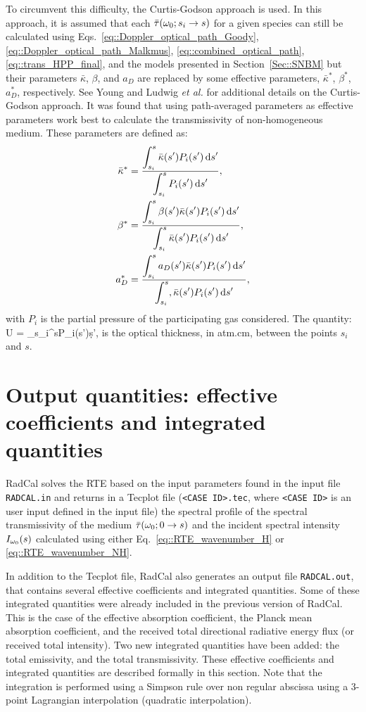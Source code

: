 To circumvent this difficulty, the Curtis-Godson approach is used. In this approach, it is assumed that
each $\bar{\tau}(\omega_0; s_i \rightarrow s)$ for a given species can still be calculated using Eqs.~\ref{eq::Doppler_optical_path_Goody}, \ref{eq::Doppler_optical_path_Malkmus}, \ref{eq::combined_optical_path}, \ref{eq::trans_HPP_final}, and the models presented in Section~\ref{Sec::SNBM} but their parameters $\bar{\kappa}$, $\beta$, and $a_D$ are replaced by some effective parameters, $\bar{\kappa}^*$, $\beta^*$, $a_{D}^*$, respectively. See Young \cite{Young1977d} and Ludwig \textit{et al.} \cite{Ludwig1973} for additional details on the Curtis-Godson approach. It was found that using path-averaged parameters as effective parameters work best \cite{Young1977d} to calculate the transmissivity of non-homogeneous medium. These parameters are defined as:
\begin{align}
\bar{\kappa}^* &= \dfrac{\displaystyle\int_{s_i}^{s} \bar{\kappa}(s')P_i(s')\,\mathrm{d} s'}{\displaystyle\int_{s_i}^{s} P_i(s')\,\mathrm{d} s'}, \label{eq::effective_kappa} \\
\beta^* &= \dfrac{\displaystyle\int_{s_i}^{s} \beta(s')\bar{\kappa}(s')P_i(s')\,\mathrm{d} s'}{\displaystyle\int_{s_i}^{s} \bar{\kappa}(s')P_i(s')\,\mathrm{d} s'}, \label{eq::effective_beta}\\
a_D^* &= \dfrac{\displaystyle\int_{s_i}^{s} a_D(s')\bar{\kappa}(s')P_i(s')\,\mathrm{d} s'}{\displaystyle\int_{s_i}^{s}, \bar{\kappa}(s')P_i(s')\,\mathrm{d} s'},\label{eq::effective_ad}
\end{align}
with $P_i$ is the partial pressure of the participating gas considered. The quantity:
\be
U = \displaystyle\int_{s_i}^{s}{P_i(s')\d s'},
\ee
is the optical thickness, in {\rm atm.cm}, between the points $s_i$ and $s$.

\section{Output quantities: effective coefficients and integrated quantities}\label{sec::Output}
RadCal solves the RTE based on the input parameters found in the input file \verb=RADCAL.in= and returns in a Tecplot file (\verb=<CASE ID>.tec=, where \verb=<CASE ID>= is an user input defined in the input file) the spectral profile of the spectral transmissivity of the medium $\bar{\tau}(\omega_0; 0 \rightarrow s)$ and the incident spectral intensity $I_{\omega_0}(s)$ calculated using either Eq.~\ref{eq::RTE_wavenumber_H} or \ref{eq::RTE_wavenumber_NH}.

In addition to the Tecplot file, RadCal also generates an output file \verb=RADCAL.out=, that contains several effective coefficients and integrated quantities. Some of these integrated quantities were already included in the previous version of RadCal. This is the case of the effective absorption coefficient, the Planck mean absorption coefficient, and the received total directional radiative energy flux (or received total intensity). Two new integrated quantities have been added: the total emissivity, and the total transmissivity. These effective coefficients and integrated quantities are described formally in this section. Note that the integration is performed using a Simpson rule over non regular abscissa using a 3-point Lagrangian interpolation (quadratic interpolation).

